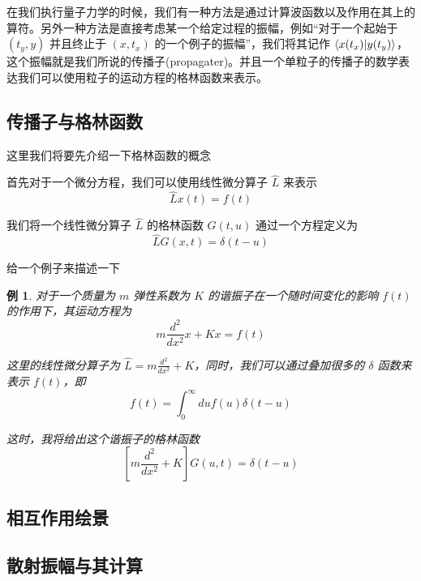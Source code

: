 \documentclass{article}
\newtheorem{example}{例}
\begin{document}
在我们执行量子力学的时候，我们有一种方法是通过计算波函数以及作用在其上的算符。另外一种方法是直接考虑某一个给定过程的振幅，例如“对于一个起始于 $(t_y,y)$ 并且终止于 $(x,t_x)$ 的一个例子的振幅”，我们将其记作 $\bra{x(t_x)}\ket{y(t_y)}$，这个振幅就是我们所说的传播子(propagater)。并且一个单粒子的传播子的数学表达我们可以使用粒子的运动方程的格林函数来表示。

\subsection{传播子与格林函数}
这里我们将要先介绍一下格林函数的概念

首先对于一个微分方程，我们可以使用线性微分算子 $\hat{L}$ 来表示
\begin{equation*}
    \hat{L} x(t) = f(t)
\end{equation*}

我们将一个线性微分算子 $\hat{L}$ 的格林函数 $G(t,u)$ 通过一个方程定义为
\begin{equation*}
    \hat{L} G(x,t) = \delta (t - u)
\end{equation*}

给一个例子来描述一下
\begin{example}
    对于一个质量为 $m$ 弹性系数为 $K$ 的谐振子在一个随时间变化的影响 $f(t)$ 的作用下，其运动方程为 
    \begin{equation*}
        m\frac{d^2}{dx^2}{x} + Kx = f(t)
    \end{equation*}

    这里的线性微分算子为 $\displaystyle \hat{L} = m\frac{d^2}{dx^2} + K$，同时，我们可以通过叠加很多的 $\delta$ 函数来表示 $f(t)$，即
    \begin{equation*}
        f(t) = \int_0^\infty du f(u) \delta (t - u) 
    \end{equation*}
    
    这时，我将给出这个谐振子的格林函数
    \begin{equation*}
        \left[m\frac{d^2}{dx^2} + K\right]G(u,t) = \delta(t - u)
    \end{equation*}
\end{example}


\subsection{相互作用绘景}







\subsection{散射振幅与其计算}
\end{document}
